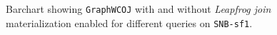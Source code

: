 \begin{figure}[H]
  \centering
  
  \caption{Barchart showing \texttt{GraphWCOJ} with and without \textit{Leapfrog join} materialization
           enabled for different queries on \texttt{SNB-sf1}.}
  \label{fig:mat-vs-nomat}
\end{figure}
